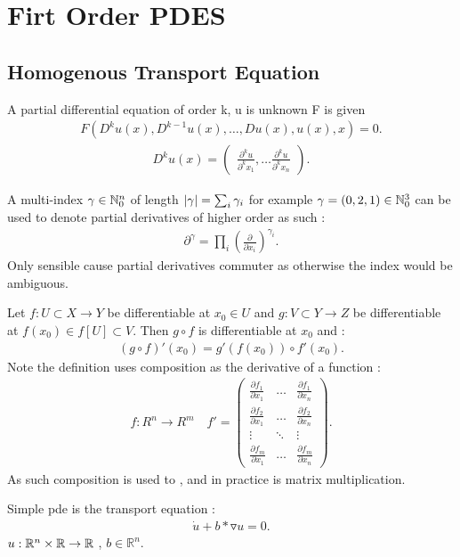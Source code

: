 \chapter{Firt Order PDES}
\setcounter{section}{-1}
\section{Homogenous Transport Equation}
\begin{definition}
A partial differential equation of order k, u is unknown F is given
\begin{align*}
  F(D^ku(x),D^{k-1}u(x),\ldots ,Du(x),u(x),x)=0
.\end{align*}
\begin{align*}
  D^k u(x) = \begin{pmatrix} \frac{\partial^k u}{\partial^k x_1},\ldots  \frac{\partial^k u}{\partial^k x_n} \end{pmatrix} 
.\end{align*}
\end{definition}
\begin{definition}
A multi-index $\gamma \in \mathbb{N}_0^n$ of length $\lvert\gamma \rvert = \sum_{i} \gamma_i$
for example $\gamma  = (0,2,1) \in \mathbb{N}^3_0$  can be used to denote partial derivatives of higher order as such : 
\begin{align*}
  \partial^{\gamma } = \prod_i (\frac{\partial}{\partial x_i})^{\gamma_i}
.\end{align*}
Only sensible cause partial derivatives commuter as otherwise the index would be ambiguous.
\end{definition}
\begin{definition}
Let $f : U \subset X \to Y$ be differentiable at $x_0 \in U$ and $g : V \subset Y \to Z$ be differentiable at $f(x_0) \in f[U] \subset  V$.
Then $g \circ f$ is differentiable at $x_0$ and : 
\begin{align*}
  (g \circ f)'(x_0) = g'(f(x_0)) \circ f'(x_0)
.\end{align*}
Note the definition uses composition as the derivative of a function : 
\begin{align*}
  f : R^n \to  R^m \quad f' = 
  \begin{pmatrix} 
    \frac{\partial f_1}{\partial x_1} & \ldots &  \frac{\partial f_1}{\partial x_n}  \\ 
    \frac{\partial f_2}{\partial x_1} & \ldots &  \frac{\partial f_2}{\partial x_n}  \\ 
    \vdots & \ddots &  \vdots  \\ 
    \frac{\partial f_m}{\partial x_1} & \ldots &  \frac{\partial f_m}{\partial x_n}  
  \end{pmatrix} 
.\end{align*}
As such composition is used to , and in practice is matrix multiplication.
\end{definition}
Simple pde is the transport equation :
\begin{align*}
\dot{u} + b* \triangledown u = 0
.\end{align*}
$u : \mathbb{R}^n \times \mathbb{R} \to \mathbb{R}$ , $b \in \mathbb{R}^n$. 
